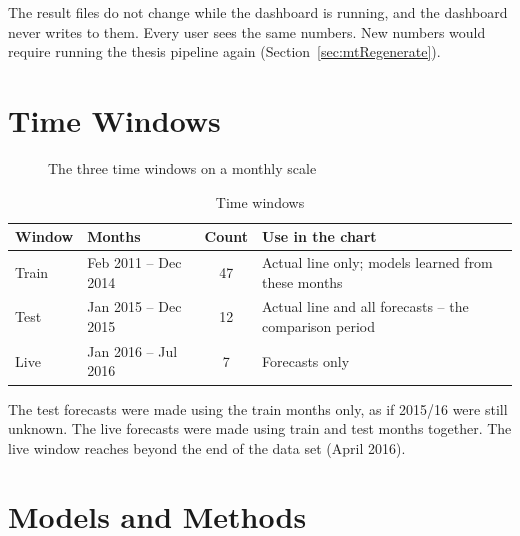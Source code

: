 \begin{NoteBox}
The result files do not change while the dashboard is running, and the dashboard never writes to them. Every user sees the same numbers. New numbers would require running the thesis pipeline again (Section~\ref{sec:mtRegenerate}).
\end{NoteBox}

\section{Time Windows}
\label{sec:specTime}

\begin{figure}[H]
  \centering
  \resizebox{\linewidth}{!}{}
  \caption{The three time windows on a monthly scale}
  \label{fig:timeWindows}
\end{figure}

\begin{table}[H]
\centering
\caption{Time windows}
\label{tab:specTime}
\small
\begin{tabularx}{\linewidth}{@{}llcX@{}}
\toprule
\textbf{Window} & \textbf{Months} & \textbf{Count} & \textbf{Use in the chart} \\
\midrule
Train & Feb 2011 -- Dec 2014 & 47 & Actual line only; models learned from these months \\
Test  & Jan 2015 -- Dec 2015 & 12 & Actual line and all forecasts -- the comparison period \\
Live  & Jan 2016 -- Jul 2016 & 7  & Forecasts only \\
\bottomrule
\end{tabularx}
\end{table}

The test forecasts were made using the train months only, as if 2015/16 were still unknown. The live forecasts were made using train and test months together. The live window reaches beyond the end of the data set (April 2016).

\section{Models and Methods}
\label{sec:specModels}

